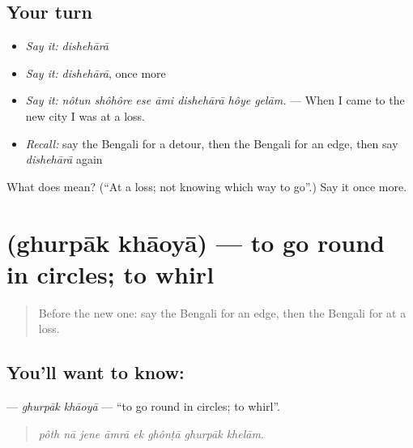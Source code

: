 \subsection*{Your turn}
\begin{itemize}
\raggedright
  \item \emph{Say it:} \emph{dishehārā}
  \item \emph{Say it:} \emph{dishehārā}, once more
  \item \emph{Say it:} \emph{nôtun shôhôre ese āmi dishehārā hôye gelām.} — When I came to the new city I was at a loss.
  \item \emph{Recall:} say the Bengali for a detour, then the Bengali for an edge, then say \emph{dishehārā} again
\end{itemize}

\begin{tcolorbox}[breakable,colback=teal!4,colframe=teal!35!black,title={Before you move on}]
What does  mean? (\textquotedblleft{}At a loss; not knowing which way to go\textquotedblright{}.) Say it once more.
\end{tcolorbox}
\section[\texorpdfstring{\bn{ঘুরপাক} \bn{খাওয়া} (ghurpāk khāoyā)}{ঘুরপাক খাওয়া (ghurpāk khāoyā)}]{  (ghurpāk khāoyā) — to go round in circles; to whirl}

\label{lesson:BN-C402-ghurpak-khaoya}



\begin{quote}
Before the new one: say the Bengali for an edge, then the Bengali for at a loss.
\end{quote}

\subsection*{You'll want to know:  }
\textbf{ } — \emph{ghurpāk khāoyā} — \textquotedblleft{}to go round in circles; to whirl\textquotedblright{}.

\begin{quote}
       
\end{quote}

\begin{quote}
\emph{pôth nā jene āmrā ek ghônṭā ghurpāk khelām.}
\end{quote}

